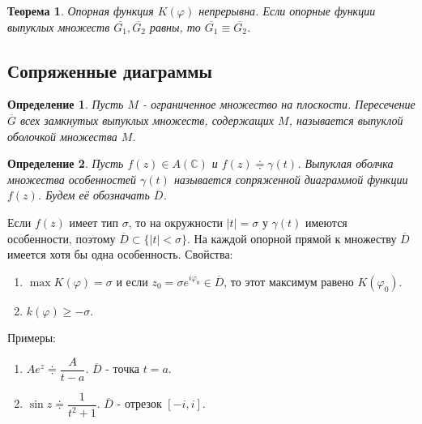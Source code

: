 \documentclass[9pt]{article}
\newtheorem{theorem}{Теорема} %
\newtheorem{definition}{Определение}
\begin{document}
			\begin{theorem}
				Опорная функция $K(\varphi)$ непрерывна. Если опорные функции выпуклых множеств $\overline{G_1}, \overline{G_2}$ равны, то $\overline{G_1} \equiv \overline{G_2}$.
			\end{theorem}
			\subsection{Сопряженные диаграммы}
				\begin{definition}
					Пусть $M$ - ограниченное множество на плоскости. Пересечение $\overline{G}$ всех замкнутых выпуклых множеств, содержащих $M$, называется выпуклой оболочкой множества $M$.
				\end{definition}
				
				\begin{definition}
					Пусть $f(z) \in A(\mathbb{C})$ и $f(z)  \doteqdot \gamma(t)$. Выпуклая оболчка множества особенностей $\gamma(t)$ называется сопряженной диаграммой функции $f(z)$. Будем её обозначать $\overline{D}$.
				\end{definition}
				
				Если $f(z)$ имеет тип $\sigma$, то на окружности $|t| = \sigma$ у $\gamma(t)$ имеются особенности, поэтому $\overline{D}\subset \{|t| < \sigma\}$.
				На каждой опорной прямой к множеству $\overline{D}$ имеется хотя бы одна особенность.
				Свойства:
				\begin{enumerate}
					\item $\max{K(\varphi)} = \sigma$ и если $z_0 = \sigma e^{i\varphi_0} \in \overline{D}$, то этот максимум равено $K(\varphi_0)$.
					\item $k(\varphi) \geq - \sigma$.
				\end{enumerate}
				Примеры:
				\begin{enumerate}
					\item $Ae^z \doteqdot \dfrac{A}{t-a}$. $\overline{D}$ - точка $t = a$.
					\item $\sin{z} \doteqdot \dfrac{1}{t^2 + 1}$. $\overline{D}$ - отрезок $[-i, i]$.
				\end{enumerate}
\end{document}

